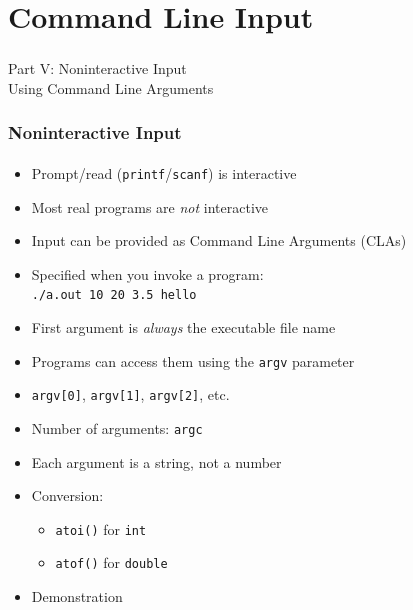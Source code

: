 \documentclass[]{beamer}
\begin{document}
\section{Command Line Input}

\begin{frame}
    \frametitle{}
    \framesubtitle{}
    
    \begin{center}
    {\Huge Part V: Noninteractive Input}\\
    {\Large Using Command Line Arguments}
    \end{center}

\end{frame}

\begin{frame}[fragile]
    \frametitle{Noninteractive Input}
    \framesubtitle{}

\begin{itemize}[<+->]
  \item Prompt/read (\texttt{printf}/\texttt{scanf}) is interactive
  \item Most real programs are \emph{not} interactive
  \item Input can be provided as Command Line Arguments (CLAs)
  \item Specified when you invoke a program: \\
  \texttt{./a.out 10 20 3.5 hello}
  \item First argument is \emph{always} the executable file name 
  \item Programs can access them using the \texttt{argv} parameter
  \item \texttt{argv[0]}, \texttt{argv[1]}, \texttt{argv[2]}, etc.
  \item Number of arguments: \texttt{argc}
  \item Each argument is a string, not a number
  \item Conversion:
  \begin{itemize}
    \item \texttt{atoi()} for \texttt{int}
    \item \texttt{atof()} for \texttt{double}
  \end{itemize}
  \item Demonstration    
\end{itemize}    

\end{frame}
\end{document}
